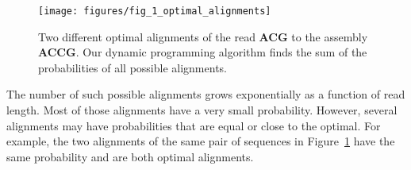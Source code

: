 \begin{figure}[h!]
\begin{center}
\texttt{[image: figures/fig\_1\_optimal\_alignments]}
\end{center}
\renewcommand{\baselinestretch}{1}
\small\normalsize
\begin{quote}
\caption[Multiple optimal read alignments.]{Two different optimal alignments of the read \textbf{ACG} to the assembly \textbf{ACCG}. Our dynamic programming algorithm finds the sum of the probabilities of all possible alignments.}
\label{different_optimal_alignments}
\end{quote}
\end{figure}
\renewcommand{\baselinestretch}{2}
\small\normalsize
\newpage




The number of such possible alignments grows exponentially as a
function of read length.  Most of those alignments have a very
small probability.  However, several alignments may have probabilities
that are equal or close to the optimal.  For example, the two alignments
of the same pair of sequences in
Figure~\ref{different_optimal_alignments} have the same probability
and are both optimal alignments.

